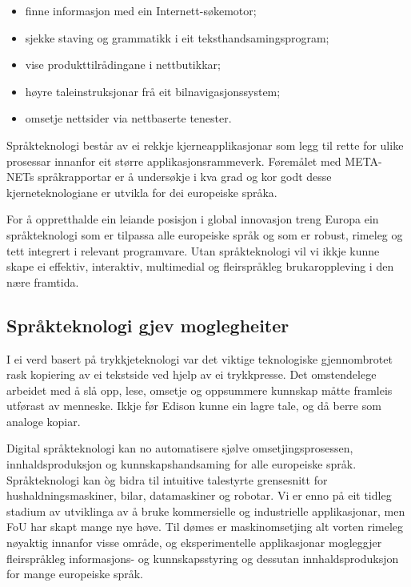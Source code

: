 \begin{multicols}{2}
\begin{itemize}
\item finne informasjon med ein Internett-søkemotor; 
\item sjekke staving og grammatikk i eit teksthandsamingsprogram; 
\item vise produkttilrådingane i nettbutikkar; 
\item høyre taleinstruksjonar frå eit bilnavigasjonssystem; 
\item omsetje nettsider via nettbaserte tenester. 
\end{itemize}

Språkteknologi består av ei rekkje kjerneapplikasjonar som legg til rette for ulike prosessar innanfor eit større applikasjonsrammeverk. Føremålet med META-NETs språkrapportar er å undersøkje i kva grad og kor godt desse kjerneteknologiane er utvikla for dei europeiske språka. 


For å oppretthalde ein leiande posisjon i global innovasjon treng Europa ein språkteknologi som er tilpassa alle europeiske språk og som er robust, rimeleg og tett integrert i relevant programvare. Utan språkteknologi vil vi ikkje kunne skape ei effektiv, interaktiv, multimedial og fleirspråkleg brukaroppleving i den nære framtida.

\subsection{Språkteknologi gjev moglegheiter}

I ei verd basert på trykkjeteknologi var det viktige teknologiske gjennombrotet rask kopiering av ei tekstside ved hjelp av ei trykkpresse. Det omstendelege arbeidet med å slå opp, lese, omsetje og oppsummere kunnskap måtte framleis utførast av menneske. Ikkje før Edison kunne ein lagre tale, og då berre som analoge kopiar. 

Digital språkteknologi kan no automatisere sjølve omsetjingsprosessen, innhaldsproduksjon og kunnskapshandsaming for alle europeiske språk. Språkteknologi kan òg bidra til intuitive talestyrte grensesnitt for hushaldningsmaskiner, bilar, datamaskiner og robotar. Vi er enno på eit tidleg stadium av utviklinga av å bruke kommersielle og industrielle applikasjonar, men FoU har skapt mange nye høve. Til dømes er maskinomsetjing alt vorten rimeleg nøyaktig innanfor visse område, og eksperimentelle applikasjonar mogleggjer fleirspråkleg informasjons- og kunnskapsstyring og dessutan innhaldsproduksjon for mange europeiske språk. 


\end{multicols}
